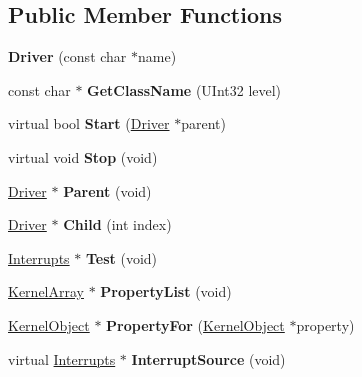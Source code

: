 \subsection*{Public Member Functions}
\begin{DoxyCompactItemize}
\item 
\mbox{\label{class_driver_a539239c6c0fa57667ae0997ef7da9d96}} 
{\bfseries Driver} (const char $\ast$name)
\item 
\mbox{\label{class_driver_a0b9ee00795cffded27141c950a8abbc2}} 
const char $\ast$ {\bfseries Get\+Class\+Name} (U\+Int32 level)
\item 
\mbox{\label{class_driver_af3af210d6320609cbb81dd6368c6eacf}} 
virtual bool {\bfseries Start} (\hyperlink{class_driver}{Driver} $\ast$parent)
\item 
\mbox{\label{class_driver_a6a4db5aaca6e3cdac7122b90b7abedb0}} 
virtual void {\bfseries Stop} (void)
\item 
\mbox{\label{class_driver_a160ea51a9f3e9588f3a33bdc7f9c65a7}} 
\hyperlink{class_driver}{Driver} $\ast$ {\bfseries Parent} (void)
\item 
\mbox{\label{class_driver_a03f1c650a55570a51d79bfc1245084c2}} 
\hyperlink{class_driver}{Driver} $\ast$ {\bfseries Child} (int index)
\item 
\mbox{\label{class_driver_a46822daa4eeba0a9da1acd786c95ca40}} 
\hyperlink{class_interrupts}{Interrupts} $\ast$ {\bfseries Test} (void)
\item 
\mbox{\label{class_driver_a53d7f2e9902a94c67515ba171b4b9943}} 
\hyperlink{class_kernel_array}{Kernel\+Array} $\ast$ {\bfseries Property\+List} (void)
\item 
\mbox{\label{class_driver_aa2977aba000e5ebdabf777295eba2618}} 
\hyperlink{class_kernel_object}{Kernel\+Object} $\ast$ {\bfseries Property\+For} (\hyperlink{class_kernel_object}{Kernel\+Object} $\ast$property)
\item 
\mbox{\label{class_driver_aca1cafa4d4695c093f5895d7d39be50d}} 
virtual \hyperlink{class_interrupts}{Interrupts} $\ast$ {\bfseries Interrupt\+Source} (void)
\end{DoxyCompactItemize}
